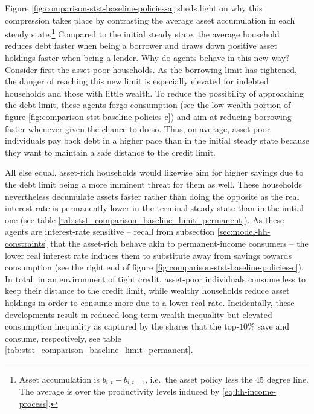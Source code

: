 \documentclass[12pt]{article} %
\numberwithin{equation}{section} %
\numberwithin{figure}{section}
\numberwithin{table}{section}
\begin{document}
Figure \ref{fig:comparison-stst-baseline-policies-a} sheds light on why this compression takes place by contrasting the average asset accumulation in each steady state.\footnote{Asset accumulation is $b_{i,t} - b_{i,t-1}$, i.e.~the asset policy less the $45$ degree line. The average is over the productivity levels induced by \eqref{eq:hh-income-process}.} Compared to the initial steady state, the average household reduces debt faster when being a borrower and draws down positive asset holdings faster when being a lender. Why do agents behave in this new way? Consider first the asset-poor households. As the borrowing limit has tightened, the danger of reaching this new limit is especially elevated for indebted households and those with little wealth. To reduce the possibility of approaching the debt limit, these agents forgo consumption (see the low-wealth portion of figure \ref{fig:comparison-stst-baseline-policies-c}) and aim at reducing borrowing faster whenever given the chance to do so. Thus, on average, asset-poor individuals pay back debt in a higher pace than in the initial steady state because they want to maintain a safe distance to the credit limit.

All else equal, asset-rich households would likewise aim for higher savings due to the debt limit being a more imminent threat for them as well. These households nevertheless decumulate assets faster rather than doing the opposite as the real interest rate is permanently lower in the terminal steady state than in the initial one (see table \ref{tab:stst_comparison_baseline_limit_permanent}). As these agents are interest-rate sensitive -- recall from subsection \ref{sec:model-hh-constraints} that the asset-rich behave akin to permanent-income consumers -- the lower real interest rate induces them to substitute away from savings towards consumption (see the right end of figure \ref{fig:comparison-stst-baseline-policies-c}). In total, in an environment of tight credit, asset-poor individuals consume less to keep their distance to the credit limit, while wealthy households reduce asset holdings in order to consume more due to a lower real rate. Incidentally, these developments result in reduced long-term wealth inequality but elevated consumption inequality as captured by the shares that the top-$10\%$ save and consume, respectively, see table \ref{tab:stst_comparison_baseline_limit_permanent}.
\end{document}
